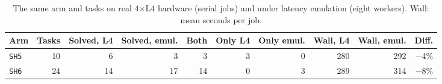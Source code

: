 \begin{table}[t]
\centering
\footnotesize
\caption{The same arm and tasks on real 4$\times$L4 hardware (serial jobs) and under latency emulation (eight workers). Wall: mean seconds per job.}
\label{tab:lfour}
\begin{tabular}{lrrrrrrrrr}
\toprule
Arm & Tasks & Solved, L4 & Solved, emul. & Both & Only L4 & Only emul. & Wall, L4 & Wall, emul. & Diff. \\
\midrule
\texttt{SH5} & 10 & 6 & 3 & 3 & 3 & 0 & 280 & 292 & \ensuremath{-}4\% \\
\texttt{SH6} & 24 & 14 & 17 & 14 & 0 & 3 & 289 & 314 & \ensuremath{-}8\% \\
\bottomrule
\end{tabular}
\end{table}
